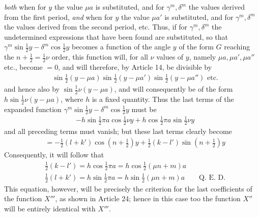 \textit{both} when for $y$ the value $\mu a$ is substituted, and for $\gamma^m,\delta^m$ the values derived from the first period,
\textit{and} when for $y$ the value $\mu a'$ is substituted, and for $\gamma^m,\delta^m$ the values derived from the second period, etc. Thus, if for $\gamma^m,\delta^m$ the undetermined expressions that have been found are substituted, so that $\gamma^m\sin\tfrac12y-\delta^m\cos\tfrac12y$ becomes a function of the angle $y$ of the form $G$ reaching the $n+\tfrac12=\tfrac12\nu$ order, this function will, for all $\nu$ values of $y$, namely $\mu a,\mu a',\mu a''$ etc., become $=0$, and will therefore, by Article 14, be divisible by
\[
\begin{aligned}
&\sin\tfrac12(y-\mu a)\sin\tfrac12(y-\mu a')\sin\tfrac12(y-\mu a'')\text{ etc.}
\end{aligned}
\]
and hence also by $\sin\tfrac12\nu(y-\mu a)$, and will consequently be of the form $h\sin\tfrac12\nu(y-\mu a)$, where $h$ is a fixed quantity. Thus the last terms of the expanded function $\gamma^m\sin\tfrac12y-\delta^m\cos\tfrac12y$ must be
\[
\begin{aligned}
&-h\sin\tfrac12\pi a\cos\tfrac12\nu y+h\cos\tfrac12\pi a\sin\tfrac12\nu y
\end{aligned}
\]
and all preceding terms must vanish; but these last terms clearly become
\[
\begin{aligned}
&=-\tfrac12(l+k')\cos(n+\tfrac12)y+\tfrac12(k-l')\sin(n+\tfrac12)y
\end{aligned}
\]
Consequently, it will follow that
\[
\begin{aligned}
&\tfrac12(k-l')=h\cos\tfrac12\pi a=h\cos\tfrac12(\mu n+m)a\\[5pt]
&\tfrac12(l+k')=h\sin\tfrac12\pi a=h\sin\tfrac12(\mu n+m)a\qquad\text{Q.~E.~D.}
\end{aligned}
\]
This equation, however, will be precisely the criterion for the last coefficients of the function
$X'''$, as shown in Article 24; hence in this case too the function $X''$ will be
entirely identical with $X'''$.

